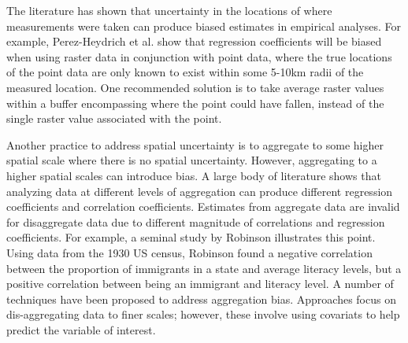The literature has shown that uncertainty in the locations of where measurements were taken can produce biased estimates in empirical analyses.\cite{perez-heydrich_guidelines_2013,rettie_overcoming_1999} For example, Perez-Heydrich et al. show that regression coefficients will be biased when using raster data in conjunction with point data, where the true locations of the point data are only known to exist within some 5-10km radii of the measured location.\cite{perez-heydrich_guidelines_2013} One recommended solution is to take average raster values within a buffer encompassing where the point could have fallen, instead of the single raster value associated with the point.\cite{perez-heydrich_guidelines_2013, rettie_overcoming_1999}
\par
Another practice to address spatial uncertainty is to aggregate to some higher spatial scale where there is no spatial uncertainty.\cite{perez-heydrich_guidelines_2013} However, aggregating to a higher spatial scales can introduce bias. A large body of literature shows that analyzing data at different levels of aggregation can produce different regression coefficients and correlation coefficients.\cite{clark_effects_1976, selvin_durkheims_1958, gotway_combining_2002, gehlke_certain_1934, cramer_efficient_1964} Estimates from aggregate data are invalid for disaggregate data due to different magnitude of correlations and regression coefficients. For example, a seminal study by Robinson illustrates this point. Using data from the 1930 US census, Robinson found a negative correlation between the proportion of immigrants in a state and average literacy levels, but a positive correlation between being an immigrant and literacy level.\cite{robinson_ecological_2009} A number of techniques have been proposed to address aggregation bias. Approaches focus on dis-aggregating data to finer scales; however, these involve using covariats to help predict the variable of interest.\cite{gotway_combining_2002, zhu_combined_2004} 



